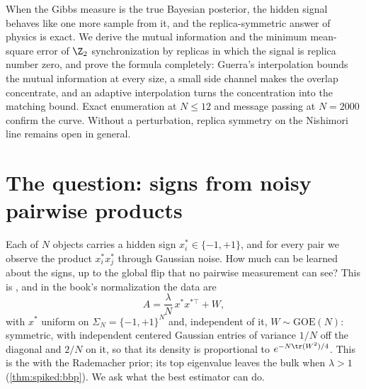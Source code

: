 \begin{refsection}

\begin{chaptersummary}
When the Gibbs measure is the true Bayesian posterior, the hidden signal behaves like one more sample from it, and the replica-symmetric answer of physics is exact. We derive the mutual information and the minimum mean-square error of $\Z_2$ synchronization by replicas in which the signal is replica number zero, and prove the formula completely: Guerra's interpolation bounds the mutual information at every size, a small side channel makes the overlap concentrate, and an adaptive interpolation turns the concentration into the matching bound. Exact enumeration at $N\le12$ and message passing at $N=2000$ confirm the curve. Without a perturbation, replica symmetry on the Nishimori line remains open in general.
\end{chaptersummary}

\section{The question: signs from noisy pairwise products}\label{sec:nishimori:question}

Each of $N$ objects carries a hidden sign $x^*_i\in\{-1,+1\}$, and for every pair we observe the product $x^*_ix^*_j$ through Gaussian noise. How much can be learned about the signs, up to the global flip that no pairwise measurement can see? This is , and in the book's normalization the data are
\begin{equation}\label{eq:nishimori:model}
A=\frac\lambda N\,x^*x^{*\top}+W,
\end{equation}
with $x^*$ uniform on $\Sigma_N=\{-1,+1\}^N$ and, independent of it, $W\sim\mathrm{GOE}(N)$: symmetric, with independent centered Gaussian entries of variance $1/N$ off the diagonal and $2/N$ on it, so that its density is proportional to $e^{-N\tr(W^2)/4}$. This is the  with the Rademacher prior; its top eigenvalue leaves the bulk when $\lambda>1$ (\cref{thm:spiked:bbp}). We ask what the best estimator can do.


\end{refsection}
